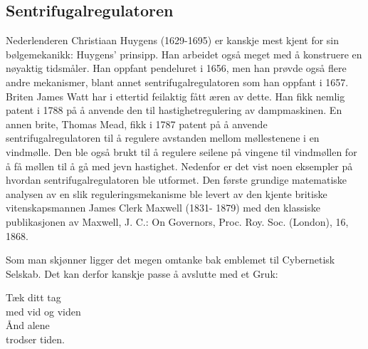 \documentclass[../main.tex]{subfiles}
\begin{document}
\subsection{Sentrifugalregulatoren}
Nederlenderen Christiaan Huygens (1629-1695) er kanskje mest kjent for sin bølgemekanikk: Huygens' prinsipp. Han arbeidet også meget med å konstruere en nøyaktig tidsmåler. Han oppfant pendeluret i 1656, men han prøvde også flere andre mekanismer, blant annet sentrifugalregulatoren som han oppfant i 1657. Briten James Watt har i ettertid feilaktig fått æren av dette. Han fikk nemlig patent i 1788 på å anvende den til hastighetregulering av dampmaskinen. En annen brite, Thomas Mead, fikk i 1787 patent på å anvende sentrifugalregulatoren til å regulere avstanden mellom møllestenene i en vindmølle. Den ble også brukt til å regulere seilene på vingene til vindmøllen for å få møllen til å gå med jevn hastighet. Nedenfor er det vist noen eksempler på hvordan sentrifugalregulatoren ble utformet. Den første grundige matematiske analysen av en slik reguleringsmekanisme ble levert av den kjente britiske vitenskapsmannen James Clerk Maxwell (1831- 1879) med den klassiske publikasjonen av Maxwell, J. C.: On Governors, Proc. Roy. Soc. (London), 16, 1868.


Som man skjønner ligger det megen omtanke bak emblemet til Cybernetisk Selskab. Det kan derfor kanskje passe å avslutte med et Gruk:
\begin{center}
Tæk ditt tag\\
med vid og viden\\
Ånd alene\\
trodser tiden.
\end{center}
\end{document}
